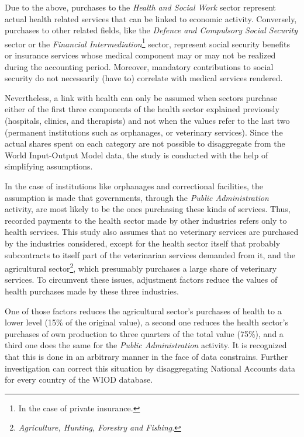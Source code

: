 \documentclass[a4paper,12pt]{article}
\begin{document}
Due to the above, purchases to the \textit{Health and Social Work} sector represent actual health related services that can be linked to economic activity. Conversely, purchases to other related fields, like the \textit{Defence and Compulsory Social Security} sector or the \textit{Financial Intermediation}\footnote{In the case of private insurance.} sector, represent social security benefits or insurance services whose medical component may or may not be realized during the accounting period. Moreover, mandatory contributions to social security do not necessarily (have to) correlate with medical services rendered. 

Nevertheless, a link with health can only be assumed when sectors purchase either of the first three components of the health sector explained previously (hospitals, clinics, and therapists) and not when the values refer to the last two (permanent institutions such as orphanages, or veterinary services). Since the actual shares spent on each category are not possible to disaggregate from the World Input-Output Model data, the study is conducted with the help of simplifying assumptions.

In the case of institutions like orphanages and correctional facilities, the assumption is made that governments, through the \textit{Public Administration} activity, are most likely to be the ones purchasing these kinds of services. Thus, recorded payments to the health sector made by other industries refers only to health services. 
This study also assumes that no veterinary services are purchased by the industries considered, except for the health sector itself that probably subcontracts to itself part of the veterinarian services demanded from it, and the agricultural sector\footnote{\textit{Agriculture, Hunting, Forestry and Fishing}.}, which presumably purchases a large share of veterinary services. To circumvent these issues, adjustment factors reduce the values of health purchases made by these three industries.

One of those factors reduces the agricultural sector's purchases of health to a lower level (15\% of the original value), a second one reduces the health sector's purchases of own production to three quarters of the total value (75\%), and a third one does the same for the \textit{Public Administration} activity. It is recognized that this is done in an arbitrary manner in the face of data constrains. Further investigation can correct this situation by disaggregating National Accounts data for every country of the WIOD database.
\end{document}
